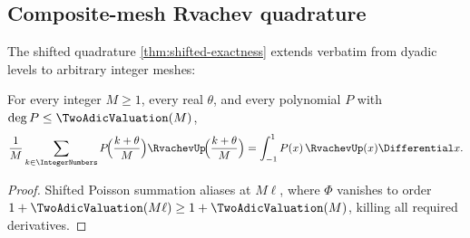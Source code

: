 \subsection{Composite-mesh Rvachev quadrature}

The shifted quadrature \cref{thm:shifted-exactness} extends verbatim
from dyadic levels to arbitrary integer meshes:

\begin{theorem}
\label{thm:up-composite-mesh}
For every integer $M\ge1$, every real $\theta$, and every polynomial
$P$ with $\deg P\le\TwoAdicValuation(M)$,
\begin{equation}
 \frac1M\sum_{k\in\IntegerNumbers}
 P\!\Bigl(\frac{k+\theta}{M}\Bigr)
 \RvachevUp\!\Bigl(\frac{k+\theta}{M}\Bigr)
 =\int_{-1}^{1}P(x)\,\RvachevUp(x)\Differential x.
 \label{eq:up-composite-mesh}
\end{equation}
\end{theorem}

\begin{proof}
Shifted Poisson summation aliases at $M\ell$, where $\Phi$ vanishes to
order $1+\TwoAdicValuation(M\ell)\ge1+\TwoAdicValuation(M)$, killing all required derivatives.
\end{proof}


